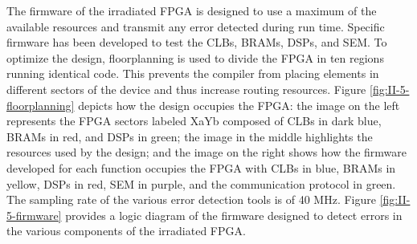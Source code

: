    The firmware of the irradiated FPGA is designed to use a maximum of the available resources and transmit any error detected during run time. Specific firmware has been developed to test the CLBs, BRAMs, DSPs, and SEM. To optimize the design, floorplanning is used to divide the FPGA in ten regions running identical code. This prevents the compiler from placing elements in different sectors of the device and thus increase routing resources. Figure \ref{fig:II-5-floorplanning} depicts how the design occupies the FPGA: the image on the left represents the FPGA sectors labeled XaYb composed of CLBs in dark blue, BRAMs in red, and DSPs in green; the image in the middle highlights the resources used by the design; and the image on the right shows how the firmware developed for each function occupies the FPGA with CLBs in blue, BRAMs in yellow, DSPs in red, SEM in purple, and the communication protocol in green. The sampling rate of the various error detection tools is of 40 MHz. Figure \ref{fig:II-5-firmware} provides a logic diagram of the firmware designed to detect errors in the various components of the irradiated FPGA.

